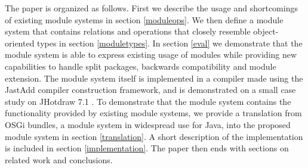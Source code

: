 The paper is organized as follows. First we describe the
usage and shortcomings of existing module systems in section \ref{moduleops}. We then 
define a module system that contains relations and operations 
that closely resemble object-oriented types in section \ref{moduletypes}. 
In section \ref{eval} we demonstrate that the module
system is able to express existing usage of modules while providing new
capabilities to handle split packages, backwards compatibility and module extension. The module system
itself is implemented in a compiler made using the JastAdd\cite{jastadd} compiler construction
framework, and is demonstrated on a small case study on JHotdraw 7.1 \cite{jhotdraw}.
To demonstrate that the module system contains the functionality provided by existing
module systems, we provide a translation from OSGi bundles, a module system in widespread
use for Java, into the proposed module system in section \ref{translation}.
A short description of the implementation is included in section \ref{implementation}.
The paper then ends with sections on related work and conclusions.
